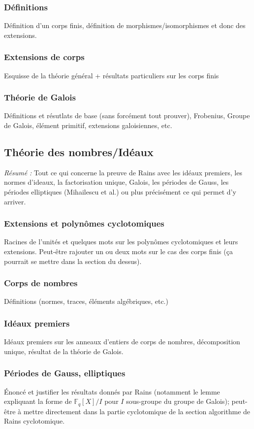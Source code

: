 \documentclass[a4paper]{article} %
\numberwithin{equation}{section}
\newcommand\GF[1]{\mathbb{F}_{#1}}
\begin{document}
\subsubsection{Définitions}
Définition d'un corps finis, définition de morphismes/isomorphismes et donc des
extensions.
\subsubsection{Extensions de corps}
Esquisse de la théorie général + résultats particuliers sur les corps finis
\subsubsection{Théorie de Galois}
Définitions et résutlats de base (sans forcément tout prouver), Frobenius, 
Groupe de Galois, élément primitif, extensions galoisiennes, etc.


\subsection{Théorie des nombres/Idéaux}
\textit{Résumé :} Tout ce qui concerne la preuve de Rains avec les idéaux 
premiers, les normes d'ideaux, la factorisation unique, Galois, les périodes de 
Gauss, les périodes elliptiques (Mihailescu et al.) ou plus précisément ce qui 
permet d'y arriver.
\subsubsection{Extensions et polynômes cyclotomiques}
Racines de l'unités et quelques mots sur les polynômes cyclotomiques et leurs 
extensions. Peut-être rajouter un ou deux mots sur le cas des corps finis (ça 
pourrait se mettre dans la section du dessus).
\subsubsection{Corps de nombres}
Définitions (normes, traces, éléments algébriques, etc.)
\subsubsection{Idéaux premiers}
 Idéaux premiers sur les anneaux d'entiers de corps de nombres,
 décomposition unique, résultat de la théorie de Galois.
\subsubsection{Périodes de Gauss, elliptiques}
Énoncé et justifier les résultats donnés par Rains (notamment le lemme
expliquant la forme de $\GF{q}[X]/I$ pour $I$ sous-groupe du groupe de Galois);
peut-être à mettre directement dans la partie cyclotomique de la section
algorithme de Rains cyclotomique.
\end{document}
